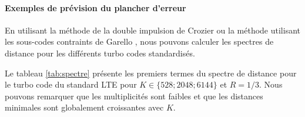 \paragraph*{Exemples de prévision du plancher d'erreur}
En utilisant la méthode de la double impulsion de Crozier \cite{crozierDIM} ou la méthode utilisant les sous-codes contraints de Garello \cite{garellodfree}, nous pouvons calculer les spectres de distance pour les différents turbo codes standardisés.

Le tableau \ref{tab:spectre} présente les premiers termes du spectre de distance pour le turbo code du standard LTE pour $K \in \{528; 2048; 6144\}$ et $R=1/3$. Nous pouvons remarquer que les multiplicités sont faibles et que les distances minimales sont globalement croissantes avec $K$.

% 			

